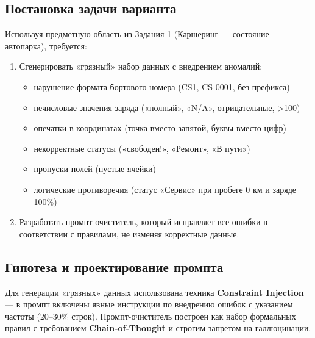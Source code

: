 \documentclass[oneside,a4paper,14pt]{extarticle} %
\begin{document}
	\subsection{Постановка задачи варианта}
	\noindent
	Используя предметную область из Задания 1 (Каршеринг --- состояние автопарка), требуется:
	\begin{enumerate}
		\item Сгенерировать «грязный» набор данных с внедрением аномалий:
		\begin{itemize}
			\item нарушение формата бортового номера (CS1, CS-0001, без префикса)
			\item нечисловые значения заряда («полный», «N/A», отрицательные, >100)
			\item опечатки в координатах (точка вместо запятой, буквы вместо цифр)
			\item некорректные статусы («свободен!», «Ремонт», «В пути»)
			\item пропуски полей (пустые ячейки)
			\item логические противоречия (статус «Сервис» при пробеге 0 км и заряде 100\%)
		\end{itemize}
		\item Разработать промпт-очиститель, который исправляет все ошибки в соответствии с правилами, не изменяя корректные данные.
	\end{enumerate}
	\subsection{Гипотеза и проектирование промпта}
	\noindent
	Для генерации «грязных» данных использована техника \textbf{Constraint Injection} --- в промпт включены явные инструкции по внедрению ошибок с указанием частоты (20--30\% строк). Промпт-очиститель построен как набор формальных правил с требованием \textbf{Chain-of-Thought} и строгим запретом на галлюцинации.
	\newpage
\end{document}
